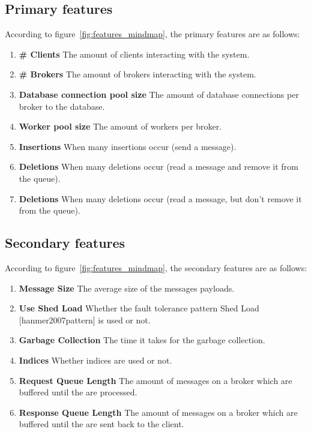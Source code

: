 \documentclass[milestone1.tex]{subfiles}
\begin{document}
\subsection{Primary features}

According to figure~\ref{fig:features_mindmap}, the primary features are as follows:

\begin{enumerate}
  \item \textbf{\# Clients} The amount of clients interacting with the system.
  \item \textbf{\# Brokers} The amount of brokers interacting with the system.
  \item \textbf{Database connection pool size} The amount of database connections per broker to the database.
  \item \textbf{Worker pool size} The amount of workers per broker.
  \item \textbf{Insertions} When many insertions occur (send a message).
  \item \textbf{Deletions} When many deletions occur (read a message and remove it from the queue).
  \item \textbf{Deletions} When many deletions occur (read a message, but don't remove it from the queue).
\end{enumerate}


\subsection{Secondary features}

According to figure~\ref{fig:features_mindmap}, the secondary features are as follows:

\begin{enumerate}
  \item \textbf{Message Size} The average size of the messages payloads.
  \item \textbf{Use Shed Load} Whether the fault tolerance pattern Shed Load [hanmer2007pattern] is used or not.
  \item \textbf{Garbage Collection} The time it takes for the garbage collection.
  \item \textbf{Indices} Whether indices are used or not.
  \item \textbf{Request Queue Length} The amount of messages on a broker which are buffered until the are processed.
    \item \textbf{Response Queue Length} The amount of messages on a broker which are buffered until the are sent back to the client.
\end{enumerate}
\end{document}
